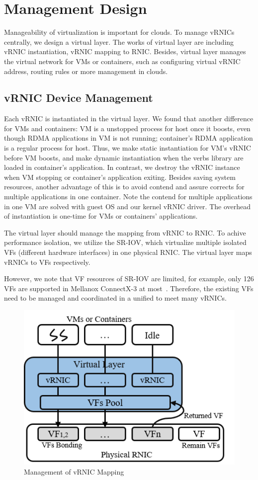 \section{Management Design}
Manageability of virtualization is important for clouds. To manage vRNICs centrally, we design a virtual layer. The works of virtual layer are including vRNIC instantiation, vRNIC mapping to RNIC. Besides, virtual layer manages the virtual network for VMs or containers, such as configuring virtual vRNIC address, routing rules or more management in clouds.

\subsection{vRNIC Device Management}
Each vRNIC is instantiated in the virtual layer. We found that another difference for VMs and containers: VM is a unstopped process for host once it boosts, even though RDMA applications in VM is not running; container's RDMA application is a regular process for host. Thus, we make static instantiation for VM's vRNIC before VM boosts, and make dynamic instantiation when the verbs library are loaded in container's application. In contrast, we destroy the vRNIC instance when VM stopping or container's application exiting. Besides saving system resources, another advantage of this is to avoid contend and assure corrects for multiple applications in one container. Note the contend for multiple applications in one VM are solved with guest OS and our kernel vRNIC driver. The overhead of instantiation is one-time for VMs or containers' applications.

The virtual layer should manage the mapping from vRNIC to RNIC. To achive performance isolation, we utilize the SR-IOV, which virtualize multiple isolated VFs (different hardware interfaces) in one physical RNIC. The virtual layer maps vRNICs to VFs respectively. 

However, we note that VF resources of SR-IOV are limited, for example, only 126 VFs are supported in Mellanox ConnectX-3 at most~\cite{ofed-manual}. Therefore, the existing VFs need to be managed and coordinated in a unified to meet many vRNICs.

\begin{figure}[!ht]
	\centering
	\includegraphics[width=0.9\linewidth]{images/vf-mapping}
	\caption{Management of vRNIC Mapping}
	\label{fig:vf-mapping}
\end{figure}

